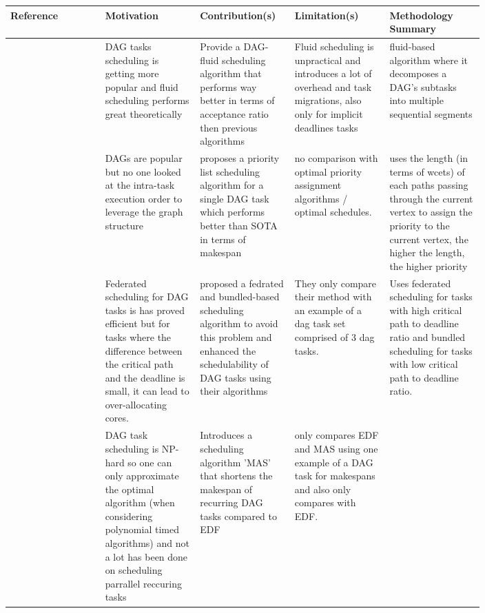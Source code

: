 \begin{table}
    \centering
    \begin{tabular}[]{|l|p{0.20\linewidth}|p{0.20\linewidth}|p{0.20\linewidth}|p{0.20\linewidth}|}
        \hline
        \textbf{Reference} & \textbf{Motivation} & \textbf{Contribution(s)} & \textbf{Limitation(s)} & \textbf{Methodology Summary}\\
        \hline
        \cite{guan2021DAGfluid}  & DAG tasks scheduling is getting more popular and fluid scheduling performs great theoretically & Provide a DAG-fluid scheduling algorithm
        that performs way better in terms of acceptance ratio then previous algorithms & Fluid scheduling is unpractical and introduces a lot of overhead and task migrations, also only for implicit deadlines tasks
        & fluid-based algorithm where it decomposes a DAG's subtasks into multiple sequential segments\\
        \hline
        \cite{He2019DagIntra}  & DAGs are popular but no one looked at the intra-task execution order to leverage the graph structure & proposes a priority list scheduling algorithm for a single DAG task
        which performs better than SOTA in terms of makespan & no comparison with optimal priority assignment algorithms / optimal schedules.  & uses the length (in terms of wcets) of each paths passing through the current vertex to assign the priority to the current vertex,
        the higher the length, the higher priority \\
        \hline
        \cite{Kobayashi2023FedBundledDagsched} & Federated scheduling for DAG tasks is has proved efficient but 
        for tasks where the difference between the critical path and the deadline is small, it
        can lead to over-allocating cores.  & proposed a fedrated and bundled-based scheduling algorithm to avoid this problem and enhanced the schedulability of DAG tasks using their algorithms & They only compare their method with an example of a dag task set comprised of 3 dag tasks. & Uses federated scheduling for tasks with high critical path to deadline ratio and bundled scheduling for tasks with low critical path to deadline ratio. \\
        \hline
        \cite{Xiao2019} & DAG task scheduling is NP-hard so one can only approximate the optimal algorithm (when considering polynomial timed algorithms)
        and not a lot has been done on scheduling parrallel reccuring tasks & Introduces a scheduling algorithm 'MAS' that shortens the makespan of recurring DAG tasks compared to EDF & only compares EDF and MAS using one example of a DAG task for makespans and also only compares with EDF.

\end{tabular}
\end{table}
